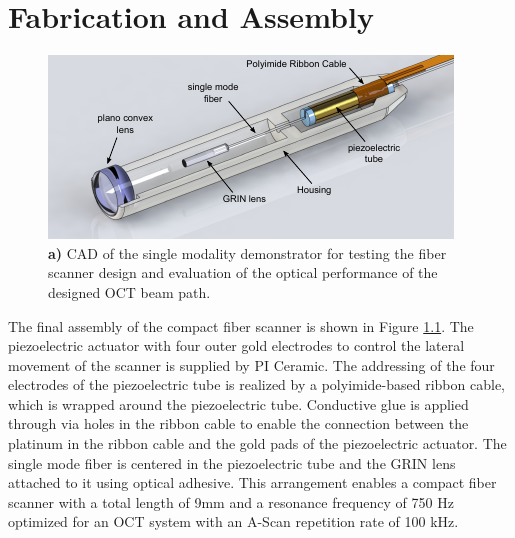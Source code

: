 %
\chapter{Fabrication and Assembly}
\label{Ch:Fab}	



\begin{figure}[h!]\centering 
\includegraphics[width=\columnwidth]{figures/40_Fabrication/overview.pdf}
      \caption{\textbf{a)} CAD of the single modality demonstrator for testing the fiber scanner design and evaluation of the optical performance of the designed OCT beam path. }
      \label{fig:overview}
\end{figure}

The final assembly of the compact fiber scanner is shown in Figure \ref{fig:overview}. The piezoelectric actuator with four outer gold electrodes to control the lateral movement of the scanner is supplied by PI Ceramic. The addressing of the four electrodes of the piezoelectric tube is realized by a polyimide-based ribbon cable, which is wrapped around the piezoelectric tube. Conductive glue is applied through via holes in the ribbon cable to enable the connection between the platinum in the ribbon cable and the gold pads of the piezoelectric actuator. The single mode fiber is centered in the piezoelectric tube and the GRIN lens attached to it using optical adhesive. This arrangement enables a compact fiber scanner with a total length of 9mm and a resonance frequency of 750 Hz optimized for an OCT system with an A-Scan repetition rate of 100 kHz.

